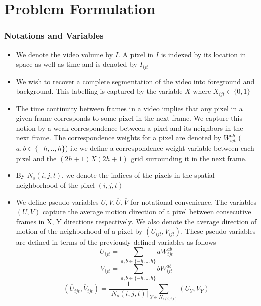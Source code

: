 \documentclass{article}
\begin{document}
\section{Problem Formulation}
\label{sec:ProbForm}
\subsubsection*{Notations and Variables}
\begin{itemize}
\item We denote the video volume by $I$. A pixel in $I$ is indexed by
its location in space as well as time and is denoted by $I_{ijt}$
\item We wish to recover a complete segmentation of the video into foreground
and background. This labelling is captured by the variable $X$ where
$X_{ijt}\in\{0,1\}$
\item The time continuity between frames in a video implies that any pixel
in a given frame corresponds to some pixel in the next frame. We capture
this notion by a weak correspondence between a pixel and its neighbors
in the next frame. The correspondence weights for a pixel are denoted
by $W_{ijt}^{ab}$ ($a,b\in\{-h,..,h\}$) i.e we define a correspondence
weight variable between each pixel and the $(2h+1)X(2h+1)$ grid surrounding
it in the next frame.
\item By $N_{s}(i,j,t)$, we denote the indices of the pixels in the spatial
neighborhood of the pixel $(i,j,t)$
\item We define pseudo-variables $U,V,\overline{U},\overline{V}$ for notational
convenience. The variables $(U,V)$ capture the average motion direction
of a pixel between consecutive frames in X, Y directions respectively.
We also denote the average direction of motion of the neighborhood
of a pixel by $(\overline{U}_{ijt},\overline{V}_{ijt}).$ These pseudo
variables are defined in terms of the previously defined variables
as follows -
\begin{equation}
U_{ijt}=\underset{a,b\in\{-h,..,h\}}{\sum}aW_{ijt}^{ab}
\end{equation}
\begin{equation}
V_{ijt}=\underset{a,b\in\{-h,..,h\}}{\sum}bW_{ijt}^{ab}
\end{equation}
\begin{equation}
(\overline{U}_{ijt},\overline{V}_{ijt})=\frac{1}{|N_{s}(i,j,t)|}\underset{Y\in N_{s(i,j,t)}}{\sum}(U_{Y},V_{Y})
\end{equation}

\end{itemize}
\end{document}
